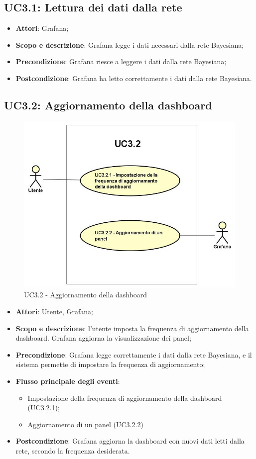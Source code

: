 \subsection{UC3.1: Lettura dei dati dalla rete}
\hypertarget{UC3.1}{}
\begin{itemize}
	\item \textbf{Attori}: Grafana;
	\item \textbf{Scopo e descrizione}: Grafana legge i dati necessari dalla rete Bayesiana;
	\item \textbf{Precondizione}: Grafana riesce a leggere i dati dalla rete Bayesiana;
	\item \textbf{Postcondizione}: Grafana ha letto correttamente i dati dalla rete Bayesiana.
\end{itemize}
\subsection{UC3.2: Aggiornamento della dashboard}
\hypertarget{UC3.2}{}
\begin{figure} [H]
	\centering
	\includegraphics[scale=0.45]{Img/UC3-2}
	\caption{UC3.2 - Aggiornamento della dashboard}\label{}
\end{figure}
\begin{itemize}
	\item \textbf{Attori}: Utente, Grafana;
	\item \textbf{Scopo e descrizione}: l'utente imposta la frequenza di aggiornamento della dashboard. Grafana aggiorna la visualizzazione dei panel;
	\item \textbf{Precondizione}: Grafana legge correttamente i dati dalla rete Bayesiana, e il sistema permette di impostare la frequenza di aggiornamento;
	\item \textbf{Flusso principale degli eventi}:
	\begin{itemize}
		\item Impostazione della frequenza di aggiornamento della dashboard (UC3.2.1);
		\item Aggiornamento di un panel (UC3.2.2)
	\end{itemize}
	\item \textbf{Postcondizione}: Grafana aggiorna la dashboard con nuovi dati letti dalla rete, secondo la frequenza desiderata.
\end{itemize}
